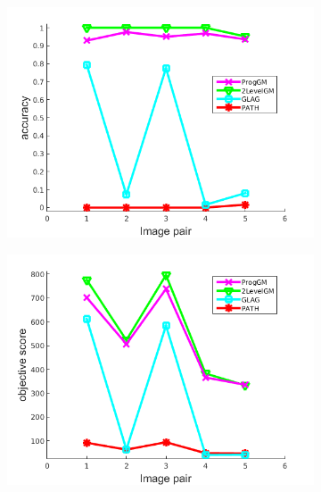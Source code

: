 \begin{figure}[h] \centering
		\begin{subfigure}[b]{0.33\textwidth}
			\centering
			\includegraphics[scale=0.25]{"chapter3/fig/ImageTrafo/anchor_descr/using_cpd_afftrafo/performance/accuracy1"} 
		\end{subfigure} 
		\begin{subfigure}[b]{0.33\textwidth}
			\centering
			\includegraphics[scale=0.25]{"chapter3/fig/ImageTrafo/anchor_descr/using_cpd_afftrafo/performance/score1"} 
		\end{subfigure}
		\begin{subfigure}[b]{0.32\textwidth}
			\centering

\end{subfigure}
\end{figure}
